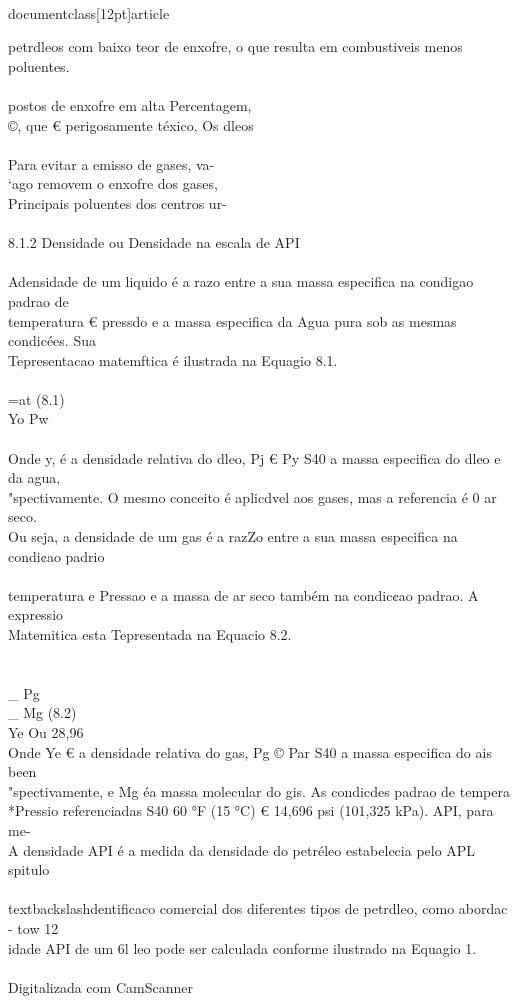 \\documentclass[12pt]{article}
\begin{document}
petrdleos com baixo teor de enxofre, o que resulta em combustiveis menos poluentes.\\
\\
postos de enxofre em alta Percentagem,\\
©, que € perigosamente téxico, Os dleos\\
\\
Para evitar a emisso de gases, va-\\
‘ago removem o enxofre dos gases,\\
Principais poluentes dos centros ur-\\
\\
8.1.2 Densidade ou Densidade na escala de API\\
\\
Adensidade de um liquido é a razo entre a sua massa especifica na condigao padrao de\\
temperatura € pressdo e a massa especifica da Agua pura sob as mesmas condicées. Sua\\
Tepresentacao matemftica é ilustrada na Equagio 8.1.\\
\\
=at (8.1)\\
Yo Pw\\
\\
Onde y, é a densidade relativa do dleo, Pj € Py S40 a massa especifica do dleo e da agua,\\
"spectivamente. O mesmo conceito é aplicdvel aos gases, mas a referencia é 0 ar seco.\\
Ou seja, a densidade de um gas é a razZo entre a sua massa especifica na condi¢ao padrio\\
\\
temperatura e Pressao e a massa de ar seco também na condic¢ao padrao. A expressio\\
Matemitica esta Tepresentada na Equacio 8.2.\\
\\
\\_ Pg \\_ Mg (8.2)\\
Ye Ou 28,96\\
Onde Ye € a densidade relativa do gas, Pg © Par S40 a massa especifica do ais been\\
"spectivamente, e Mg éa massa molecular do gis. As condicdes padrao de tempera\\
*Pressio referenciadas S40 60 °F (15 °C) € 14,696 psi (101,325 kPa). API, para me-\\
A densidade API é a medida da densidade do petréleo estabelecia pelo APL spitulo\\
\\textbackslash{}dentificaco comercial dos diferentes tipos de petrdleo, como abordac - tow 12\\
idade API de um 6l leo pode ser calculada conforme ilustrado na Equagio 1.\\
\\
Digitalizada com CamScanner\\
\end{document}
